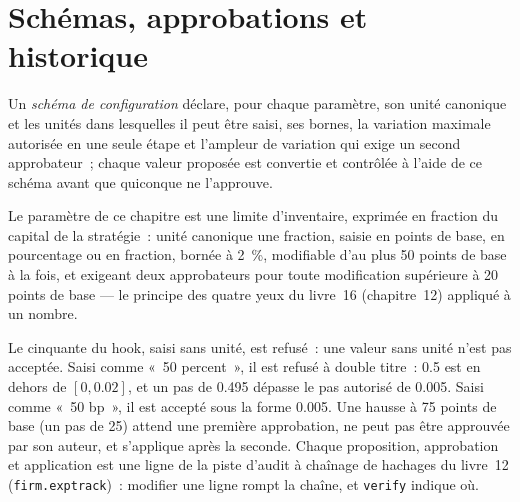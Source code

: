 \section{Schémas, approbations et historique}

\begin{definition}\label{def:pl:signal-serving-and-parameter-management:schema}
Un \emph{schéma de configuration} déclare, pour chaque paramètre, son unité canonique et les unités dans lesquelles il peut être saisi,
ses bornes, la variation maximale autorisée en une seule étape et l'ampleur de variation qui exige un second approbateur~; chaque valeur proposée est convertie
et contrôlée à l'aide de ce schéma avant que quiconque ne l'approuve.
\end{definition}

Le paramètre de ce chapitre est une limite d'inventaire, exprimée en fraction du capital de la stratégie~: unité canonique une fraction, saisie en points de base,
en pourcentage ou en fraction, bornée à 2~\%, modifiable d'au plus 50 points de base à la fois, et exigeant deux approbateurs pour toute modification supérieure à 20 points de base
--- le principe des quatre yeux du livre~16 (chapitre~12) appliqué à un nombre.

\label{lst:pl:signal-serving-and-parameter-management:propose}

Le cinquante du hook, saisi sans unité, est refusé~: une valeur sans unité n'est pas acceptée. Saisi comme «~50 percent~», il est refusé à double titre~: 0.5 est
en dehors de $[0, 0.02]$, et un pas de 0.495 dépasse le pas autorisé de 0.005. Saisi comme «~50 bp~», il est accepté sous la forme 0.005. Une hausse à 75 points de base
(un pas de 25) attend une première approbation, ne peut pas être approuvée par son auteur, et s'applique après la seconde. Chaque proposition, approbation et application
est une ligne de la piste d'audit à chaînage de hachages du livre~12 (\texttt{firm.exptrack})~: modifier une ligne rompt la chaîne, et
\texttt{verify} indique où.

\label{lst:pl:signal-serving-and-parameter-management:approve}

